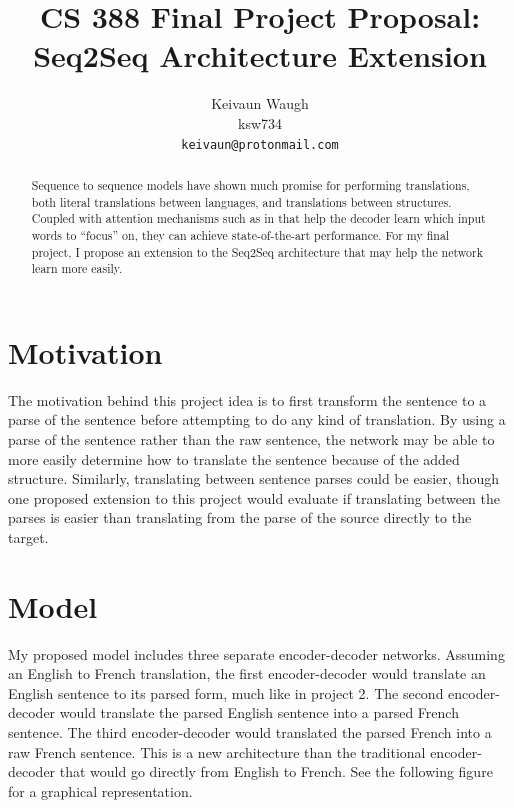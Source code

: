 \documentclass[11pt,twocolumn,letterpaper]{article}
\begin{document}
\title{
    CS 388 Final Project Proposal:
    Seq2Seq Architecture Extension\\}

\author{Keivaun Waugh\\
ksw734\\
{\tt\small keivaun@protonmail.com}
}

\maketitle

\begin{abstract}
    Sequence to sequence models \cite{Seq2Seq} have shown much promise for performing translations, both literal translations between languages, and translations between structures. Coupled with attention mechanisms such as in \cite{LuongAttention} that help the decoder learn which input words to ``focus'' on, they can achieve state-of-the-art performance. For my final project, I propose an extension to the Seq2Seq architecture that may help the network learn more easily.
\end{abstract}

\section{Motivation}
The motivation behind this project idea is to first transform the sentence to a parse of the sentence before attempting to do any kind of translation. By using a parse of the sentence rather than the raw sentence, the network may be able to more easily determine how to translate the sentence because of the added structure. Similarly, translating between sentence parses could be easier, though one proposed extension to this project would evaluate if translating between the parses is easier than translating from the parse of the source directly to the target.

\section{Model}
My proposed model includes three separate encoder-decoder networks. Assuming an English to French translation, the first encoder-decoder would translate an English sentence to its parsed form, much like in project 2. The second encoder-decoder would translate the parsed English sentence into a parsed French sentence. The third encoder-decoder would translated the parsed French into a raw French sentence. This is a new architecture than the traditional encoder-decoder that would go directly from English to French. See the following figure for a graphical representation.
\end{document}
